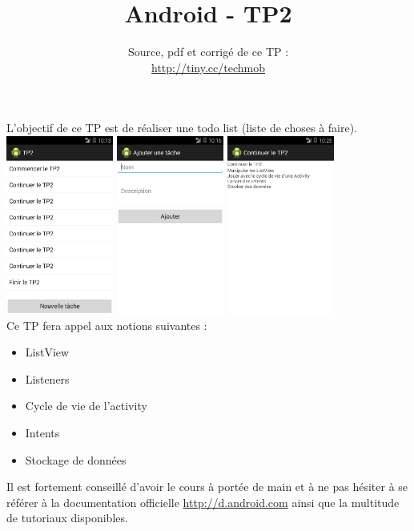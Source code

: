\documentclass{article}
\title{Android - TP2}
\date{Source, pdf et corrigé de ce TP
:\\ \href{http://tiny.cc/techmob}{http://tiny.cc/techmob}}
\begin{document}
\maketitle
L'objectif de ce TP est de réaliser une todo list (liste de choses à faire).\\
\includegraphics[width=100pt]{img/tp2screen1.png}
\includegraphics[width=100pt]{img/tp2screen2.png}
\includegraphics[width=100pt]{img/tp2screen3.png}\\
Ce TP fera appel aux notions suivantes :
\begin{itemize}
  \item ListView
  \item Listeners
  \item Cycle de vie de l'activity
  \item Intents
  \item Stockage de données
\end{itemize}
Il est fortement conseillé d'avoir le cours à portée de main et à ne pas hésiter
à se référer à la documentation officielle
\href{http://d.android.com}{http://d.android.com} ainsi que la multitude de tutoriaux disponibles.\\
\end{document}
